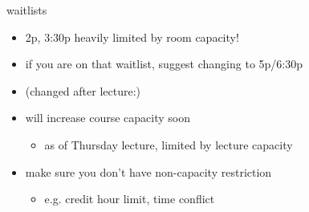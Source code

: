 \begin{frame}{waitlists}
    \begin{itemize}
    \item 2p, 3:30p heavily limited by room capacity!
    \item if you are on that waitlist, suggest changing to 5p/6:30p
    \vspace{.5cm}
    \item (changed after lecture:) 
    \item will increase course capacity soon
	\begin{itemize}
	\item as of Thursday lecture, limited by lecture capacity
	\end{itemize}
    \item make sure you don't have non-capacity restriction
	\begin{itemize}
	\item e.g. credit hour limit, time conflict
	\end{itemize}
    \end{itemize}
\end{frame}
